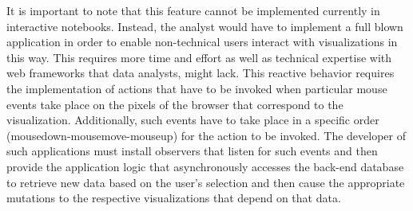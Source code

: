 It is important to note that this feature cannot be implemented currently in interactive notebooks. Instead, the analyst would have to implement a full blown application in order to enable non-technical users interact with visualizations in this way. This requires more time and effort as well as technical expertise with web frameworks that data analysts, might lack. This reactive behavior requires the implementation of actions that have to be invoked when particular mouse events take place on the pixels of the browser that correspond to the visualization. Additionally, such events have to take place in a specific order (mousedown-mousemove-mouseup) for the action to be invoked. The developer of such applications must install observers that listen for such events and then provide the application logic that asynchronously accesses the back-end database to retrieve new data based on the user's selection and then cause the appropriate mutations to the respective visualizations that depend on that data. 


